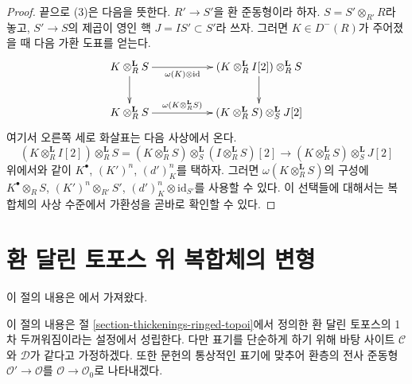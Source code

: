 \begin{proof}
\medskip\noindent
끝으로 (3)은 다음을 뜻한다. $R' \to S'$을 환 준동형이라 하자.
$S = S' \otimes_{R'} R$라 놓고, $S' \to S$의 제곱이 영인 핵
$J = IS' \subset S'$라 쓰자. 그러면 $K \in D^-(R)$가 주어졌을 때
다음 가환 도표를 얻는다.
$$
\xymatrix{
K \otimes_R^\mathbf{L} S \ar[d] \ar[rr]_-{\omega(K) \otimes \text{id}} & &
(K \otimes^\mathbf{L}_R I[2]) \otimes_R^\mathbf{L} S \ar[d] \\
K \otimes_R^\mathbf{L} S \ar[rr]^-{\omega(K \otimes_R^\mathbf{L} S)} & &
(K \otimes_R^\mathbf{L} S) \otimes^\mathbf{L}_S J[2]
}
$$
여기서 오른쪽 세로 화살표는 다음 사상에서 온다.
$$
(K \otimes^\mathbf{L}_R I[2]) \otimes_R^\mathbf{L} S =
(K \otimes_R^\mathbf{L} S) \otimes_S^\mathbf{L}
(I \otimes_R^\mathbf{L} S)[2] \longrightarrow
(K \otimes_R^\mathbf{L} S) \otimes_S^\mathbf{L} J[2]
$$
위에서와 같이 $K^\bullet$, $(K')^n$, $(d')^n_K$를 택하자. 그러면
$\omega(K \otimes_R^\mathbf{L} S)$의 구성에
$K^\bullet \otimes_R S$, $(K')^n \otimes_{R'} S'$,
$(d')^n_K \otimes \text{id}_{S'}$를 사용할 수 있다. 이 선택들에
대해서는 복합체의 사상 수준에서 가환성을 곧바로 확인할 수 있다.
\end{proof}







\section{환 달린 토포스 위 복합체의 변형}
\label{section-thickenings-complexes}

\noindent
이 절의 내용은 \cite{lieblich-complexes}에서 가져왔다.

\medskip\noindent
이 절의 내용은 절 \ref{section-thickenings-ringed-topoi}에서 정의한 환
달린 토포스의 1차 두꺼워짐이라는 설정에서 성립한다. 다만 표기를
단순하게 하기 위해 바탕 사이트 $\mathcal{C}$와 $\mathcal{D}$가 같다고
가정하겠다. 또한 문헌의 통상적인 표기에 맞추어 환층의 전사 준동형
$\mathcal{O}' \to \mathcal{O}$를
$\mathcal{O} \to \mathcal{O}_0$로 나타내겠다.


